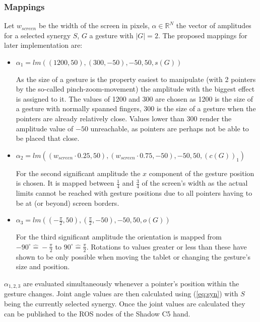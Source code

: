 \subsubsection{Mappings}

Let $w_{screen}$ be the width of the screen in pixels, $\alpha \in \mathbb{R}^N$ the vector of amplitudes for a selected synergy $S$, $G$ a gesture with $|G| = 2$. The proposed mappings for later implementation are:
\begin{itemize}
	\item $\alpha_1 = lm\left((1200, 50), (300, -50), -50, 50, s(G)\right)$
	
	As the size of a gesture is the property easiest to manipulate (with 2 pointers by the so-called pinch-zoom-movement) the amplitude with the biggest effect is assigned to it. The values of 1200 and 300 are chosen as 1200 is the size of a gesture with normally spanned fingers, 300 is the size of a gesture when the pointers are already relatively close. Values lower than 300 render the amplitude value of $-50$ unreachable, as pointers are perhaps not be able to be placed that close.
	
	\item $\alpha_2 = lm\left((w_{screen} \cdot 0.25, 50), (w_{screen} \cdot 0.75, -50), -50, 50, (c(G))_1\right)$
	
	For the second significant amplitude the $x$ component of the gesture position is chosen. It is mapped between $\frac{1}{4}$ and $\frac{3}{4}$ of the screen's width as the actual limits cannot be reached with gesture positions due to all pointers having to be at (or beyond) screen borders.
	
	\item $\alpha_3 = lm\left( \left( -\frac{\pi}{2}, 50 \right), \left( \frac{\pi}{2}, -50 \right), -50, 50, o(G) \right)$
	
	For the third significant amplitude the orientation is mapped from $-90^\circ \widehat{=} -\frac{\pi}{2}$ to $90^\circ \widehat{=} \frac{\pi}{2}$. Rotations to values greater or less than these have shown to be only possible when moving the tablet or changing the gesture's size and position.
\end{itemize}

$\alpha_{1,2,3}$ are evaluated simultaneously whenever a pointer's position within the gesture changes. Joint angle values are then calculated using (\ref{eq:syn}) with $S$ being the currently selected synergy. Once the joint values are calculated they can be published to the ROS nodes of the Shadow C5 hand.

